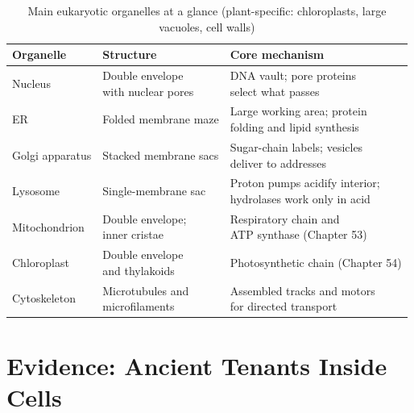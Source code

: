 \begin{table}[htbp]
\centering
\caption{Main eukaryotic organelles at a glance (plant-specific: chloroplasts, large vacuoles, cell walls)}
\begin{tabular}{lll}
\toprule
Organelle & Structure & Core mechanism \\
\midrule
Nucleus & \shortstack[l]{Double envelope\\with nuclear pores} & \shortstack[l]{DNA vault; pore proteins\\select what passes} \\
ER & Folded membrane maze & \shortstack[l]{Large working area; protein\\folding and lipid synthesis} \\
Golgi apparatus & Stacked membrane sacs & \shortstack[l]{Sugar-chain labels; vesicles\\deliver to addresses} \\
Lysosome & Single-membrane sac & \shortstack[l]{Proton pumps acidify interior;\\hydrolases work only in acid} \\
Mitochondrion & \shortstack[l]{Double envelope;\\inner cristae} & \shortstack[l]{Respiratory chain and\\ATP synthase (Chapter 53)} \\
Chloroplast & \shortstack[l]{Double envelope\\and thylakoids} & Photosynthetic chain (Chapter 54) \\
Cytoskeleton & \shortstack[l]{Microtubules and\\microfilaments} & \shortstack[l]{Assembled tracks and motors\\for directed transport} \\
\bottomrule
\end{tabular}
\end{table}

\section{Evidence: Ancient Tenants Inside Cells}


